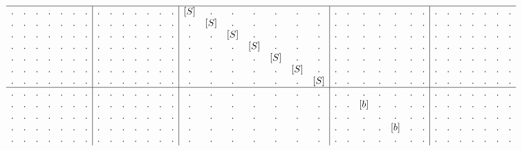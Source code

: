 \begin{example}
\begin{align}
\begin{array}{c c c c c c c | c c c c c c c | c c c c c c c | c c c c c c c | c c c c c c c}
\hline                                                                                
. & . & . & . & . & . & .   &   . & . & . & . & . & . & .   &   [S] & .   & .   & .   & .   & .   & .    &  . & . & . & . & . & . & .  &  . & . & . & . & . & . & .   \\
. & . & . & . & . & . & .   &   . & . & . & . & . & . & .   &   .   & [S] & .   & .   & .   & .   & .    &  . & . & . & . & . & . & .  &  . & . & . & . & . & . & .   \\
. & . & . & . & . & . & .   &   . & . & . & . & . & . & .   &   .   & .   & [S] & .   & .   & .   & .    &  . & . & . & . & . & . & .  &  . & . & . & . & . & . & .   \\
. & . & . & . & . & . & .   &   . & . & . & . & . & . & .   &   .   & .   & .   & [S] & .   & .   & .    &  . & . & . & . & . & . & .  &  . & . & . & . & . & . & .   \\
. & . & . & . & . & . & .   &   . & . & . & . & . & . & .   &   .   & .   & .   & .   & [S] & .   & .    &  . & . & . & . & . & . & .  &  . & . & . & . & . & . & .   \\
. & . & . & . & . & . & .   &   . & . & . & . & . & . & .   &   .   & .   & .   & .   & .   & [S] & .    &  . & . & . & . & . & . & .  &  . & . & . & . & . & . & .   \\
. & . & . & . & . & . & .   &   . & . & . & . & . & . & .   &   .   & .   & .   & .   & .   & .   & [S]  &  . & . & . & . & . & . & .  &  . & . & . & . & . & . & .   \\
\hline                                                                                
. & . & . & . & . & . & .  &  . & . & . & . & . & . & .  &  . & . & . & . & . & . & .  &  . & . & .   & . & .   & . & .    &  . & . & . & . & . & . & .   \\
. & . & . & . & . & . & .  &  . & . & . & . & . & . & .  &  . & . & . & . & . & . & .  &  . & . & [b] & . & .   & . & .    &  . & . & . & . & . & . & .   \\
. & . & . & . & . & . & .  &  . & . & . & . & . & . & .  &  . & . & . & . & . & . & .  &  . & . & .   & . & .   & . & .    &  . & . & . & . & . & . & .   \\
. & . & . & . & . & . & .  &  . & . & . & . & . & . & .  &  . & . & . & . & . & . & .  &  . & . & .   & . & [b] & . & .    &  . & . & . & . & . & . & .   \\
. & . & . & . & . & . & .  &  . & . & . & . & . & . & .  &  . & . & . & . & . & . & .  &  . & . & .   & . & .   & . & .    &  . & . & . & . & . & . & .   \\

\end{array}
\end{align}
\end{example}
